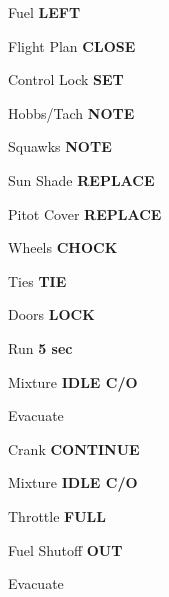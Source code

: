 \documentclass{article}
\begin{document}
\begin{multicols*}{3}
Fuel \dotfill \textbf{LEFT}

Flight Plan \dotfill \textbf{CLOSE}

\colorbox{green!80!red}{}

Control Lock \dotfill \textbf{SET}

Hobbs/Tach \dotfill \textbf{NOTE}

Squawks \dotfill \textbf{NOTE}

Sun Shade \dotfill \textbf{REPLACE}

Pitot Cover \dotfill \textbf{REPLACE}

Wheels \dotfill \textbf{CHOCK}

Ties \dotfill \textbf{TIE}

Doors \dotfill \textbf{LOCK} \\

\colorbox{red!80}{}

\colorbox{orange!80}{}

Run \dotfill \textbf{5 sec}

Mixture \dotfill \textbf{IDLE C/O}

Evacuate \dotfill

\colorbox{orange!80}{}

Crank \dotfill \textbf{CONTINUE}

Mixture \dotfill \textbf{IDLE C/O}

Throttle \dotfill \textbf{FULL}

Fuel Shutoff \dotfill \textbf{OUT}

Evacuate \dotfill \\

\end{multicols*}

\pagebreak
\end{document}
